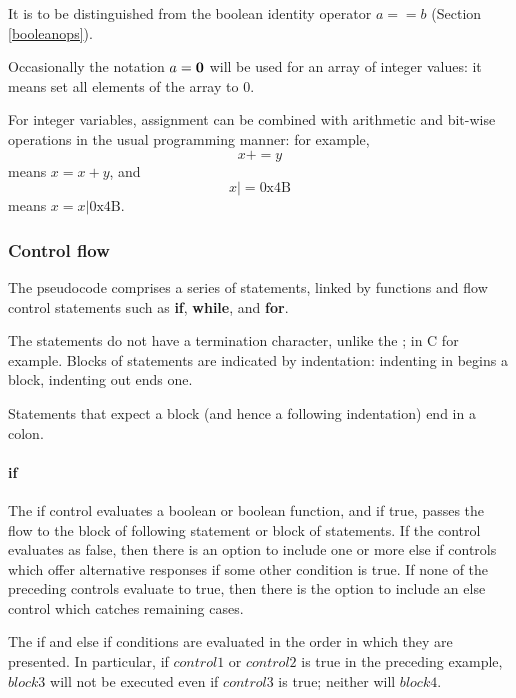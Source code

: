 It is to be distinguished from
the boolean identity operator $a==b$ (Section \ref{booleanops}).

Occasionally the notation $a={\bf 0}$ will be used for an array of integer values:
it means set all elements of the array to 0.

For integer variables, assignment can be combined with arithmetic and bit-wise
operations in the usual programming manner: for example, 
\[x+=y\]
means $x=x+y$, and
\[x |= \text{0x4B}\]
means $x=x|\text{0x4B}$.

\subsubsection{Control flow}
\label{controlflow}

The pseudocode comprises a series of statements, linked by functions and
flow control statements such as {\bf if}, {\bf while}, and {\bf for}.

The statements do not have a termination character, unlike the ; in C
for example.  Blocks of statements are indicated by indentation:
indenting in begins a block, indenting out ends one.

Statements that expect a block (and hence a following indentation) end
in a colon.

\paragraph*{if}

The if control evaluates a boolean or boolean function, and if true, passes the 
flow to the block of following statement or block of statements. If the control
evaluates as false, then there is an option to include one or more else if
controls which offer alternative responses if some other condition is
true.  If none of the preceding controls evaluate to true, then there is
the option to include an else control which catches remaining cases.

\begin{pseudo*}
\bsELSE
\bsEND
\end{pseudo*}

The if and else if conditions are evaluated in the order in which they
are presented. In particular, if $control1$ or $control2$ is true in
the preceding example, $block3$ will not be executed
even if $control3$ is true; neither will $block4$.

